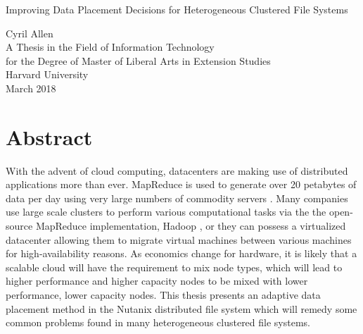 \documentclass[12pt]{article}
\begin{document}
\begin{center}

  \vspace*{0.6in}
  Improving Data Placement Decisions for Heterogeneous Clustered File Systems

  \vspace{2.3in}
  Cyril Allen\\
  \vspace{1.8in}
  A Thesis in the Field of Information Technology\\
  for the Degree of Master of Liberal Arts in Extension Studies\\
  \vspace{.8in}
  Harvard University\\

  \vfill
  March 2018
  \vspace*{.5in}
\end{center}

\newpage
\null

\newpage

\section*{Abstract}
\thispagestyle{empty}

With the advent of cloud computing, datacenters are making use of distributed
applications more than ever. MapReduce is used to generate over 20 petabytes
of data per day using very large numbers of commodity servers
\cite{mapreduce}. Many companies use large scale clusters to perform various
computational tasks via the the open-source MapReduce implementation, Hadoop
\cite{hadoop}, or they can possess a virtualized datacenter allowing them to
migrate virtual machines between various machines for high-availability
reasons. As economics change for hardware, it is likely that a scalable cloud
will have the requirement to mix node types, which will lead to higher
performance and higher capacity nodes to be mixed with lower performance,
lower capacity nodes. This thesis presents an adaptive data placement method
in the Nutanix distributed file system which will remedy some common problems
found in many heterogeneous clustered file systems.

\clearpage
\newpage
\end{document}
